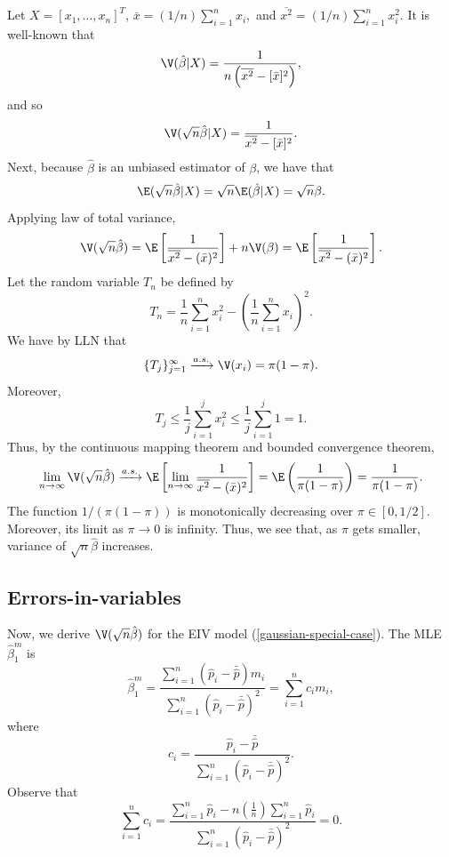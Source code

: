 \documentclass[12pt]{article}
\begin{document}
 Let $X = [x_1, \dots, x_n]^T$, $\bar{x} = (1/n) \sum_{i=1}^n x_i,$ and $\overline{x^2} = (1/n) \sum_{i=1}^n x_i^2.$  It is well-known that
$$ \V(\hat{\beta} | X) = \frac{ 1 }{n \left(\overline{x^2} - [\bar{x}]^2 \right)},$$ and so $$\V( \sqrt{n} \hat{\beta} | X ) = \frac{1}{\overline{x^2} - [\bar{x}]^2}.$$ Next, because $\hat{\beta}$ is an unbiased estimator of $\beta$, we have that
$$ \E( \sqrt{n} \hat{\beta} | X ) = \sqrt{n} \E(\hat{\beta}|X)  = \sqrt{n} \beta.$$ Applying law of total variance,
$$\V(\sqrt{n}\hat{\beta}) = \E\left[ \frac{1}{ \overline{x^2} - (\bar{x})^2} \right] + n \V(\beta) = \E\left[ \frac{1}{ \overline{x^2} - (\bar{x})^2} \right].$$
Let the random variable $T_n$ be defined by
$$T_n = \frac{1}{n}\sum_{i=1}^n x_i^2 - \left(\frac{1}{n} \sum_{i=1}^n x_i \right)^2.$$ We have by LLN that
$$\{ T_j \}_{j=1}^\infty \xrightarrow{a.s.} \V(x_i) = \pi (1-\pi).$$
Moreover, 
$$T_j \leq \frac{1}{j} \sum_{i=1}^j x_i^2 \leq \frac{1}{j} \sum_{i=1}^j 1 = 1.$$
Thus, by the continuous mapping theorem and bounded convergence theorem,
$$\lim_{n \to \infty} \V(\sqrt{n} \hat{\beta}) \xrightarrow{a.s.} \E \left[ \lim_{n \to \infty} \frac{1}{ \overline{x^2} - (\bar{x})^2} \right] = \E \left( \frac{1}{\pi(1-\pi)}\right) = \frac{1}{\pi(1-\pi)}.$$
The function $1/(\pi(1 - \pi))$ is monotonically decreasing over $\pi \in [0,1/2]$. Moreover, its limit as $\pi \to 0$ is infinity. Thus, we see that, as $\pi$ gets smaller, variance of $\sqrt{n} \hat{\beta}$ increases.

\subsection{Errors-in-variables}

Now, we derive $\V(\sqrt{n}\hat{\beta})$ for the EIV model (\ref{gaussian-special-case}). The MLE $\hat{\beta}^m_1$ is
$$ \hat{\beta}^m_1 = \frac{ \sum_{i=1}^n (\hat{p}_i - \bar{\hat{p}}) m_i }{\sum_{i=1}^n (\hat{p}_i - \bar{\hat{p}})^2} = \sum_{i=1}^n c_i m_i,$$ where $$c_i =  \frac{\hat{p}_i - \bar{\hat{p}}}{ \sum_{i=1}^n ( \hat{p}_i - \bar{\hat{p}})^2}.$$ Observe that
$$\sum_{i=1}^n c_i = \frac{\sum_{i=1}^n \hat{p}_i - n \left(\frac{1}{n}\right) \sum_{i=1}^n \hat{p}_i}{ \sum_{i=1}^n (\hat{p}_i - \bar{\hat{p}})^2} = 0.$$
\end{document}
